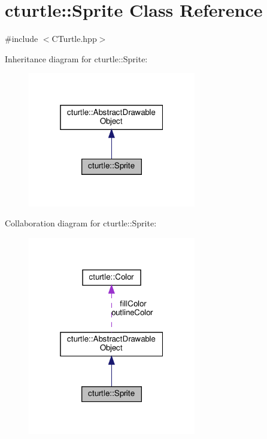 \hypertarget{classcturtle_1_1Sprite}{}\section{cturtle\+:\+:Sprite Class Reference}
\label{classcturtle_1_1Sprite}


{\ttfamily \#include $<$C\+Turtle.\+hpp$>$}



Inheritance diagram for cturtle\+:\+:Sprite\+:
\nopagebreak
\begin{figure}[H]
\begin{center}
\leavevmode
\includegraphics[width=208pt]{classcturtle_1_1Sprite__inherit__graph}
\end{center}
\end{figure}


Collaboration diagram for cturtle\+:\+:Sprite\+:
\nopagebreak
\begin{figure}[H]
\begin{center}
\leavevmode
\includegraphics[width=208pt]{classcturtle_1_1Sprite__coll__graph}
\end{center}
\end{figure}
